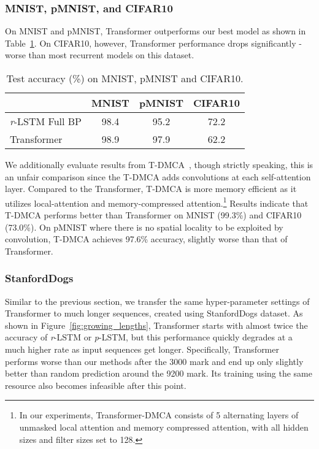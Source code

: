 \documentclass{article}
\newcommand{\rlstm}{{\it r}-LSTM}
\newcommand{\plstm}{{\it p}-LSTM}
\begin{document}
\subsubsection{MNIST, pMNIST, and CIFAR10}

On MNIST and pMNIST, Transformer outperforms our best model as shown in Table~\ref{transformer_mnist_cifar}. On CIFAR10, however, Transformer performance drops significantly - worse than most recurrent models on this dataset. 

\begin{table}[htb]
\caption{Test accuracy (\%) on MNIST, pMNIST and CIFAR10.}
\label{transformer_mnist_cifar}
\vskip 0.15in
\begin{center}
\begin{small}
\begin{tabular}{lccc}
\toprule
 & MNIST & pMNIST & CIFAR10 \\
\midrule
\rlstm{} Full BP & 98.4 & 95.2 & 72.2 \\
Transformer & 98.9 & 97.9 & 62.2 \\
\bottomrule

\end{tabular}
\end{small}
\end{center}
\vskip -0.1in
\end{table}


We additionally evaluate results from T-DMCA~\cite{liu18}, though strictly speaking, this is an unfair comparison since the T-DMCA adds convolutions at each self-attention layer. Compared to the Transformer, T-DMCA is more memory efficient as it utilizes local-attention and memory-compressed attention.\footnote{In our experiments, Transformer-DMCA consists of 5 alternating layers of unmasked local attention and memory compressed attention, with all hidden sizes and filter sizes set to 128.} Results indicate that T-DMCA performs better than Transformer on MNIST (99.3\%) and CIFAR10 (73.0\%). On pMNIST where there is no spatial locality to be exploited by convolution, T-DMCA achieves 97.6\% accuracy, slightly worse than that of Transformer.


\subsubsection{StanfordDogs}

Similar to the previous section, we transfer the same hyper-parameter settings of Transformer to much longer sequences, created using StanfordDogs dataset. As shown in Figure~\ref{fig:growing_lengths}, Transformer starts with almost twice the accuracy of \rlstm{} or \plstm{}, but this performance quickly degrades at a much higher rate as input sequences get longer. Specifically, Transformer performs worse than our methods after the 3000 mark and end up only slightly better than random prediction around the 9200 mark. Its training using the same resource also becomes infeasible after this point.
\end{document}
